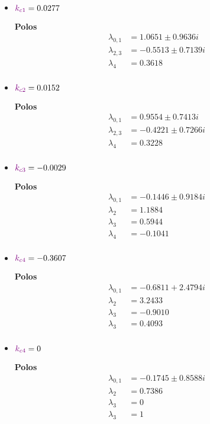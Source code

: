 \begin{multicols}{2}
  \begin{itemize}
      \item \(\mathbin{\color{violet}k_{c1}} = 0.0277 \) 

        \textbf{Polos}
        \begin{align}
        \lambda_{0,1} &= 1.0651 \pm 0.9636i \\
        \lambda_{2,3} &= -0.5513 \pm 0.7139i \\
        \lambda_{4} &= 0.3618 \\
        \end{align}

      \item \(\mathbin{\color{violet}k_{c2}} = 0.0152\)

      \textbf{Polos}
      \begin{align}
        \lambda_{0,1} &= 0.9554 \pm 0.7413i \\
        \lambda_{2,3} &= -0.4221 \pm 0.7266i\\
        \lambda_{4} &= 0.3228 \\
        \end{align}
        
  \end{itemize}
  \columnbreak
  \begin{itemize}
      \item \(\mathbin{\color{violet}k_{c3}} = -0.0029\)

      \textbf{Polos}
      \begin{align}
        \lambda_{0,1} &= -0.1446 \pm 0.9184i \\
        \lambda_{2} &= 1.1884 \\
        \lambda_{3} &= 0.5944 \\
        \lambda_{4} &= -0.1041\\
        \end{align}

      \item \(\mathbin{\color{violet}k_{c4}} = -0.3607\)

      \textbf{Polos}
      \begin{align}
        \lambda_{0,1} &= -0.6811 + 2.4794i \\
        \lambda_{2} &= 3.2433  \\
        \lambda_{3} &= -0.9010  \\
        \lambda_{3} &= 0.4093  \\
        \end{align}

        \item \(\mathbin{\color{violet}k_{c4}} = 0\)

        \textbf{Polos}
        \begin{align}
          \lambda_{0,1} &= -0.1745 \pm 0.8588i \\
          \lambda_{2} &= 0.7386  \\
          \lambda_{3} &= 0  \\
          \lambda_{3} &= 1  \\
        \end{align}
  \end{itemize}
\end{multicols}



